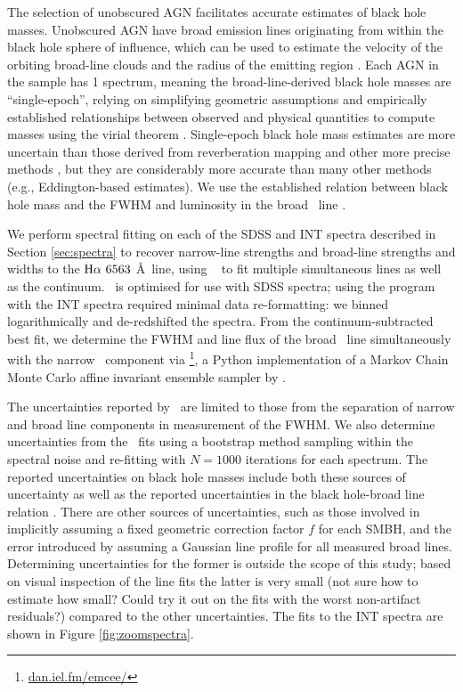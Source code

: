 The selection of unobscured AGN facilitates accurate estimates of black hole masses. Unobscured AGN have broad emission lines originating from within the black hole sphere of influence, which can be used to estimate the velocity of the orbiting broad-line clouds and the radius of the emitting region \citep{somecanonicalpapers,areviewpaper}. Each AGN in the sample has 1 spectrum, meaning the broad-line-derived black hole masses are ``single-epoch'', relying on simplifying geometric assumptions and empirically established relationships between observed and physical quantities to compute masses using the virial theorem \citep{greene,others}. Single-epoch black hole mass estimates are more uncertain than those derived from reverberation mapping and other more precise methods \citep{Barthetal_maybe,also_we_should_totally_cite_LIGO_lolz}, but they are considerably more accurate than many other methods (e.g., Eddington-based estimates). We use the established relation between black hole mass and the FWHM and luminosity in the broad \ha\ line \citep{gh07a}.

We perform spectral fitting on each of the SDSS and INT spectra described in Section \ref{sec:spectra} to recover narrow-line strengths and broad-line strengths and widths to the ${\rm H}\alpha\ 6563$ \AA\ line, using \gandalf\ \citep{sarzi06} {\notebsm to fit multiple simultaneous lines as well as the continuum}. \gandalf\ is optimised for use with SDSS spectra; using the program with the INT spectra required minimal data re-formatting: we binned logarithmically and de-redshifted the spectra. {\notebsm From the continuum-subtracted best fit}, we determine the FWHM and line flux of the broad \ha\ line simultaneously with the narrow \ha\ component via \emcee\footnote{\url{dan.iel.fm/emcee/}}, a Python implementation of a Markov Chain Monte Carlo \citep[MCMC;][]{mackay03, gw10} affine invariant ensemble sampler by \cite{emcee13}. 

The uncertainties reported by \emcee\ are limited to those from the separation of narrow and broad line components in measurement of the FWHM. {\notebsm We also determine uncertainties from the \gandalf\ fits using a bootstrap method sampling within the spectral noise and re-fitting with $N=1000$ iterations for each spectrum.} The reported uncertainties on black hole masses include both these sources of uncertainty as well as the reported uncertainties in the black hole-broad line relation \citep{gh07a}. There are other sources of uncertainties, such as those involved in implicitly assuming a fixed geometric correction factor $f$ for each SMBH, and the error introduced by assuming a Gaussian line profile for all measured broad lines. Determining uncertainties for the former is outside the scope of this study; based on visual inspection of the line fits the latter is very small {\notebsm (not sure how to estimate how small? Could try it out on the fits with the worst non-artifact residuals?)} compared to the other uncertainties. The fits to the INT spectra are shown in Figure \ref{fig:zoomspectra}.

